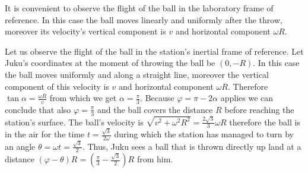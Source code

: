 {\ifEngHint
It is convenient to observe the flight of the ball in the laboratory frame of reference. In this case the ball moves linearly and uniformly after the throw, moreover its velocity’s vertical component is $v$ and horizontal component $\omega R$.
\fi


\ifEngSolution
Let us observe the flight of the ball in the station’s inertial frame of reference. Let Juku’s coordinates at the moment of throwing the ball be $(0,-R)$. In this case the ball moves uniformly and along a straight line, moreover the vertical component of this velocity is $v$ and horizontal component $\omega R$. Therefore $\tan\alpha=\frac{\omega R}{v}$ from which we get $\alpha=\frac{\pi}{3}$. Because $\varphi=\pi-2\alpha$ applies we can conclude that also $\varphi=\frac{\pi}{3}$ and the ball covers the distance $R$ before reaching the station’s surface. The ball’s velocity is $\sqrt{v^2+\omega^2R^2}=\frac{2\sqrt{3}}{3}\omega R$ therefore the ball is in the air for the time $t=\frac{\sqrt{3}}{2\omega}$ during which the station has managed to turn by an angle $\theta=\omega t=\frac{\sqrt{3}}{2}$. Thus, Juku sees a ball that is thrown directly up land at a distance $\left(\varphi-\theta\right)R=\left(\frac{\pi}{3}-\frac{\sqrt{3}}{2}\right)R$ from him.
\begin{center}
\end{center}
\fi
}